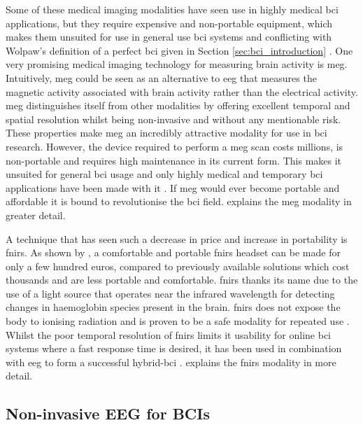 Some of these medical imaging modalities have seen use in highly medical \gls{bci} applications, but they require expensive and non-portable equipment, which makes them unsuited for use in general use \gls{bci} systems and conflicting with Wolpaw's definition of a perfect \gls{bci} given in Section \ref{sec:bci_introduction} \citep{modalities_review1,modalities_review2}.
One very promising medical imaging technology for measuring brain activity is \gls{meg}.
Intuitively, \gls{meg} could be seen as an alternative to \gls{eeg} that measures the magnetic activity associated with brain activity rather than the electrical activity.
\Gls{meg} distinguishes itself from other modalities by offering excellent temporal and spatial resolution whilst being non-invasive and without any mentionable risk.
These properties make \gls{meg} an incredibly attractive modality for use in \gls{bci} research.
However, the device required to perform a \gls{meg} scan costs millions, is non-portable and requires high maintenance in its current form.
This makes it unsuited for general \gls{bci} usage and only highly medical and temporary \gls{bci} applications have been made with it \citep{modalities_review2}.
If \gls{meg} would ever become portable and affordable it is bound to revolutionise the \gls{bci} field.
 explains the \gls{meg} modality in greater detail.

A technique that has seen such a decrease in price and increase in portability is \gls{fnirs}.
As shown by \citet{fnirs_cheap}, a comfortable and portable \gls{fnirs} headset can be made for only a few hundred euros, compared to previously available solutions which cost thousands and are less portable and comfortable.
\Gls{fnirs} thanks its name due to the use of a light source that operates near the infrared wavelength for detecting changes in haemoglobin species present in the brain.
\Gls{fnirs} does not expose the body to ionising radiation and is proven to be a safe modality for repeated use \citep{fnirs_explained}.
Whilst the poor temporal resolution of \gls{fnirs} limits it usability for online \gls{bci} systems where a fast response time is desired, it has been used in combination with \gls{eeg} to form a successful hybrid-\gls{bci} \citep{modalities_review1, eeg_fnirs_drone}.
 explains the \gls{fnirs} modality in more detail.



\subsection{Non-invasive EEG for BCIs}
\label{subsec:biomedical_signals_measuring_brain_why_eeg}

